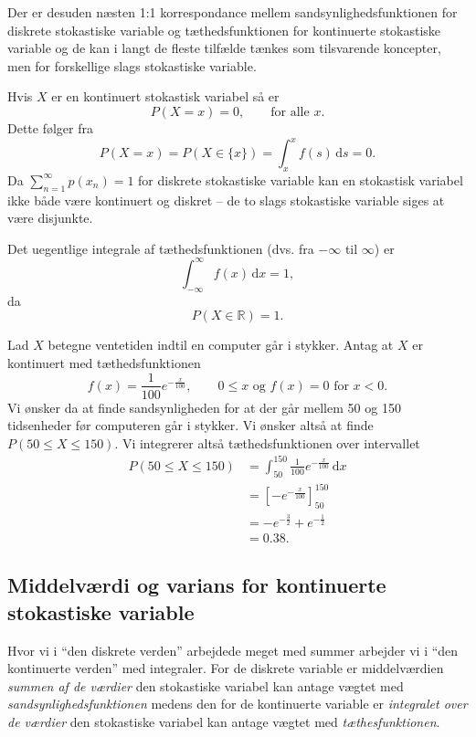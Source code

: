 Der er desuden næsten 1:1 korrespondance mellem sandsynlighedsfunktionen for diskrete stokastiske variable og tæthedsfunktionen for kontinuerte stokastiske variable og de kan i langt de fleste tilfælde tænkes som tilsvarende koncepter, men for forskellige slags stokastiske variable.

\begin{sæt}
  Hvis $X$ er en kontinuert stokastisk variabel så er
  \[ 
  P(X = x) = 0, \qquad \text{for alle } x
  .\]
  Dette følger fra
  \[ 
  P(X = x) = P(X \in \{ x \} ) = \int_{x}^{x} f(s) \, \mathrm{d}s = 0
  .\]
  Da $\sum_{n = 1}^{\infty} p(x_n) = 1$ for diskrete stokastiske variable kan en stokastisk variabel ikke både være kontinuert og diskret -- de to slags stokastiske variable siges at være disjunkte.
\end{sæt}

Det uegentlige integrale af tæthedsfunktionen (dvs. fra $-\infty$ til $\infty$) er
\[ 
  \int_{-\infty}^{\infty} f(x) \, \mathrm{d}x = 1
,\]
da
\[ 
  P(X \in \mathbb{R}) = 1
.\]

\begin{eks}
  Lad $X$ betegne ventetiden indtil en computer går i stykker. Antag at $X$ er kontinuert med tæthedsfunktionen
  \[ 
  f(x) = \frac{1}{100}e^{-\frac{x}{100}}, \qquad 0 \leq x \text{ og } f(x) = 0 \text{ for } x<0
  .\]
  Vi ønsker da at finde sandsynligheden for at der går mellem 50 og 150 tidsenheder før computeren går i stykker. Vi ønsker altså at finde $P(50 \leq X \leq 150)$. Vi integrerer altså tæthedsfunktionen over intervallet
  \begin{align*}
    P(50 \leq X \leq 150) &= \int_{50}^{150} \frac{1}{100} e^{-\frac{x}{100}} \, \mathrm{d}x \\
    &= \left[ -e^{-\frac{x}{100}} \right]_{50}^{150} \\
    &= -e^{-\frac{3}{2}} + e^{-\frac{1}{2}} \\
    &= \num{0,38} 
.\end{align*}
\end{eks}

\subsection{Middelværdi og varians for kontinuerte stokastiske variable}
Hvor vi i ``den diskrete verden'' arbejdede meget med summer arbejder vi i ``den kontinuerte verden'' med integraler. For de diskrete variable er middelværdien \textit{summen af de værdier} den stokastiske variabel kan antage vægtet med \textit{sandsynlighedsfunktionen} medens den for de kontinuerte variable er \textit{integralet over de værdier} den stokastiske variabel kan antage vægtet med \textit{tæthesfunktionen}.

